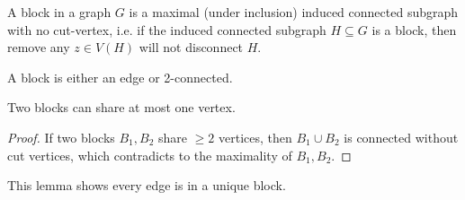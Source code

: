 \begin{definition}[Block]
    A block in a graph \(G\) is a maximal (under inclusion) induced connected subgraph with no cut-vertex, i.e. if the induced connected subgraph \(H \subseteq G\) is a block, then remove any \(z \in V(H)\) will not disconnect \(H\).  
\end{definition}

\begin{corollary}
    A block is either an edge or 2-connected.
\end{corollary} 

\begin{lemma}
    Two blocks can share at most one vertex.
\end{lemma}
\begin{proof}
    If two blocks \(B_1, B_2\) share \(\ge 2\) vertices, then \(B_1 \cup B_2\) is connected without cut vertices, which contradicts to the maximality of \(B_1, B_2\).     
\end{proof}

\begin{remark}
    This lemma shows every edge is in a unique block. 
\end{remark}

